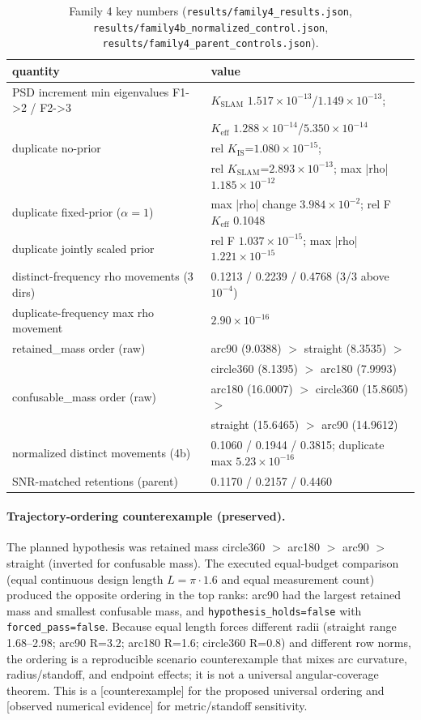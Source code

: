 \documentclass[12pt]{article}
\newcommand{\OBS}{\textnormal{[observed numerical evidence]}}
\newcommand{\CTX}{\textnormal{[counterexample]}}
\begin{document}
\begin{table}[ht]
\centering
\small
\caption{Family 4 key numbers (\texttt{results/family4\_results.json},
\texttt{results/family4b\_normalized\_control.json},
\texttt{results/family4\_parent\_controls.json}).}
\label{tab:f4}
\begin{tabular}{l l}
\toprule
quantity & value \\
\midrule
PSD increment min eigenvalues F1->2 / F2->3 &
$K_{\mathrm{SLAM}}$ $1.517\times10^{-13}$/$1.149\times10^{-13}$; \\
 & $K_{\mathrm{eff}}$ $1.288\times10^{-14}$/$5.350\times10^{-14}$ \\
duplicate no-prior & rel $K_{\mathrm{IS}}$=$1.080\times10^{-15}$; \\
 & rel $K_{\mathrm{SLAM}}$=$2.893\times10^{-13}$; max |rho| $1.185\times10^{-12}$ \\
duplicate fixed-prior ($\alpha=1$) &
max |rho| change $3.984\times10^{-2}$; rel F $K_{\mathrm{eff}}$ 0.1048 \\
duplicate jointly scaled prior &
rel F $1.037\times10^{-15}$; max |rho| $1.221\times10^{-15}$ \\
distinct-frequency rho movements (3 dirs) &
0.1213 / 0.2239 / 0.4768 (3/3 above $10^{-4}$) \\
duplicate-frequency max rho movement & $2.90\times10^{-16}$ \\
retained\_mass order (raw) &
arc90 (9.0388) $>$ straight (8.3535) $>$ \\
 & circle360 (8.1395) $>$ arc180 (7.9993) \\
confusable\_mass order (raw) &
arc180 (16.0007) $>$ circle360 (15.8605) $>$ \\
 & straight (15.6465) $>$ arc90 (14.9612) \\
normalized distinct movements (4b) &
0.1060 / 0.1944 / 0.3815; duplicate max $5.23\times10^{-16}$ \\
SNR-matched retentions (parent) & 0.1170 / 0.2157 / 0.4460 \\
\bottomrule
\end{tabular}
\end{table}

\paragraph{Trajectory-ordering counterexample (preserved).}
The planned hypothesis was retained mass
circle360 $>$ arc180 $>$ arc90 $>$ straight (inverted for confusable mass).
The executed equal-budget comparison (equal continuous design length
$L=\pi\cdot1.6$ and equal measurement count) produced the opposite ordering in
the top ranks: arc90 had the largest retained mass and smallest
confusable mass, and \texttt{hypothesis\_holds=false} with \texttt{forced\_pass=false}.
Because equal length forces different radii (straight range 1.68--2.98;
arc90 R=3.2; arc180 R=1.6; circle360 R=0.8) and different row norms, the
ordering is a reproducible scenario counterexample that mixes arc curvature,
radius/standoff, and endpoint effects; it is not a universal angular-coverage
theorem. This is a \CTX{} for the proposed universal ordering and \OBS{} for
metric/standoff sensitivity.
\end{document}
